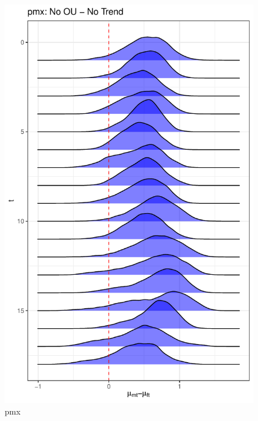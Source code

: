 \documentclass[
  12pt,
]{article}
\begin{document}
\begin{figure}

{\centering \includegraphics[width=0.9\linewidth]{../Figures/pmx/mu_diff} 

}

\caption{pmx}\label{fig:unnamed-chunk-20}
\end{figure}
\end{document}
